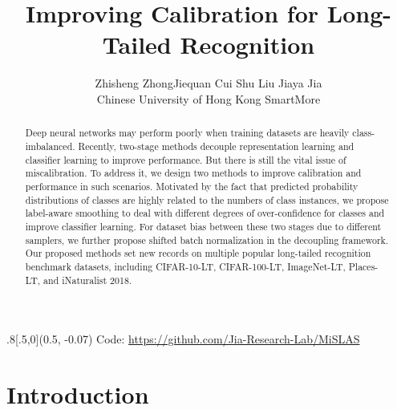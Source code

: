 \documentclass[final]{cvpr}
\begin{document}
	
\title{Improving Calibration for Long-Tailed Recognition}
	
	\author{
		Zhisheng Zhong\quad\quad Jiequan Cui \quad\quad Shu Liu \quad\quad Jiaya Jia \vspace{.3em}
		\\
		Chinese University of Hong Kong \quad\quad SmartMore \vspace{.3em}
	}
	
	
	\maketitle
	\pagestyle{empty}
	\thispagestyle{empty}
	
	
	
	\begin{textblock*}{.8\textwidth}[.5,0](0.5\textwidth, -0.07\textwidth)
		\centering
		{\small Code: \url{https://github.com/Jia-Research-Lab/MiSLAS}}
	\end{textblock*}
	


	\begin{abstract}
		Deep neural networks may perform poorly when training datasets are heavily class-imbalanced. Recently, two-stage methods decouple representation learning and classifier learning to improve performance. But there is still the vital issue of miscalibration. To address it, we design two methods to improve calibration and performance in such scenarios. Motivated by the fact that predicted probability distributions of classes are highly related to the numbers of class instances, we propose label-aware smoothing to deal with different degrees of over-confidence for classes and improve classifier learning. For dataset bias between these two stages due to different samplers, we further propose shifted batch normalization in the decoupling framework. Our proposed methods set new records on multiple popular long-tailed recognition benchmark datasets, including CIFAR-10-LT, CIFAR-100-LT, ImageNet-LT, Places-LT, and iNaturalist 2018.
	\end{abstract}
	
	
\vspace{-10pt}
	\section{Introduction}
	
\end{document}
